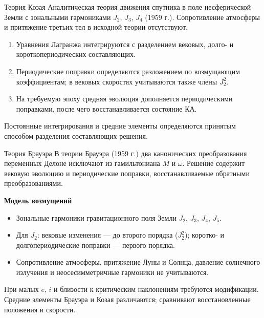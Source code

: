 \documentclass[11pt,aspectratio=169,t]{beamer}
\begin{document}
\begin{frame}{Теория Козая}
\justifying
Аналитическая теория движения спутника в поле несферической Земли с зональными гармониками $J_2$, $J_3$, $J_4$ (1959 г.). Сопротивление атмосферы и притяжение третьих тел в исходной теории отсутствуют.\par
\begin{enumerate}\setlength{\itemsep}{3pt}
\item Уравнения Лагранжа интегрируются с разделением вековых, долго- и короткопериодических составляющих.
\item Периодические поправки определяются разложением по возмущающим коэффициентам; в вековых скоростях учитываются также члены $J_2^2$.
\item На требуемую эпоху средняя эволюция дополняется периодическими поправками, после чего восстанавливается состояние КА.
\end{enumerate}
\justifying
Постоянные интегрирования и средние элементы определяются принятым способом разделения составляющих решения.
\end{frame}

\begin{frame}{Теория Брауэра}
\justifying
В теории Брауэра (1959 г.) два канонических преобразования переменных Делоне исключают из гамильтониана $M$ и $\omega$. Решение содержит вековую эволюцию и периодические поправки, восстанавливаемые обратными преобразованиями.\par\smallskip
\textbf{\color{courseaccent}Модель возмущений}
\begin{itemize}\setlength{\itemsep}{2pt}
\item Зональные гармоники гравитационного поля Земли $J_2$, $J_3$, $J_4$, $J_5$.
\item Для $J_2$: вековые изменения --- до второго порядка ($J_2^2$); коротко- и долгопериодические поправки --- первого порядка.
\item Сопротивление атмосферы, притяжение Луны и Солнца, давление солнечного излучения и неосесимметричные гармоники не учитываются.
\end{itemize}
\justifying
При малых $e$, $i$ и близости к критическим наклонениям требуются модификации. Средние элементы Брауэра и Козая различаются; сравнивают восстановленные положения и скорости.
\end{frame}
\end{document}
